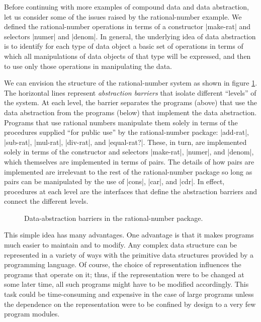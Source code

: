 Before continuing with more examples of compound data and data
abstraction, let us consider some of the issues raised by the
rational-number example.  We defined the rational-number operations in
terms of a constructor \scheme|make-rat| and selectors \scheme|numer| and
\scheme|denom|.  In general, the underlying idea of data abstraction is
to identify for each type of data object a basic set of operations in
terms of which all manipulations of data objects of that type will be
expressed, and then to use only those operations in manipulating the
data.

We can envision the structure of the rational-number system as
shown in figure \ref{fig:2.1}.  The
horizontal lines represent \textit{abstraction barriers} that isolate
different ``levels'' of the system.  At each level, the barrier
separates the programs (above) that use the data abstraction from the
programs (below) that implement the data abstraction.  Programs that
use rational numbers manipulate them solely in terms of the procedures
supplied ``for public use'' by the rational-number package: \scheme|add-rat|, \scheme|sub-rat|, \scheme|mul-rat|, \scheme|div-rat|, and \scheme|equal-rat?|. These, in turn, are implemented solely in terms of the
constructor and selectors \scheme|make-rat|, \scheme|numer|, and \scheme|denom|, which themselves are implemented in terms of pairs.  The
details of how pairs are implemented are irrelevant to the rest of the
rational-number package so long as pairs can be manipulated by the use
of \scheme|cons|, \scheme|car|, and \scheme|cdr|.  In effect, procedures at
each level are the interfaces that define the abstraction barriers and
connect the different levels.

\begin{figure}
\centering
{}
\caption{Data-abstraction barriers in the rational-number package.}
\label{fig:2.1}
\end{figure}

This simple idea has many advantages.  One advantage is that it makes
programs much easier to maintain and to modify.  Any complex data
structure can be represented in a variety of ways with the primitive
data structures provided by a programming language.  Of course, the
choice of representation influences the programs that operate on it;
thus, if the representation were to be changed at some later time, all
such programs might have to be modified accordingly.  This task could
be time-consuming and expensive in the case of large programs unless
the dependence on the representation were to be confined by design to
a very few program modules.

